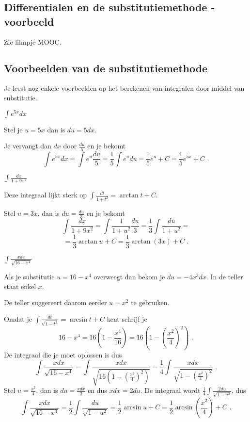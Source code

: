 \subsection{Differentialen en de substitutiemethode - voorbeeld}
Zie filmpje MOOC.

\subsection{Voorbeelden van de substitutiemethode}

Je leest nog enkele voorbeelden op het berekenen van integralen door middel van substitutie.

\vspace{2mm}

\begin{voorbeeld}
	$\int e^{5x}dx$
	
	Stel je $u=5x$ dan is $du=5dx$.
	
	Je vervangt dan $dx$ door $\frac{du}{5}$ en je bekomt
	\[
	\int e^{5x}dx=\int e^u\frac{du}{5}=\frac{1}{5} \int e^udu=\frac{1}{5} e^u+C=\frac{1}{5}e^{5x}+C \text { .}
	\]
	
\end{voorbeeld}

\begin{voorbeeld}
	$\int \frac{dx}{1+9x^2}$
	
	Deze integraal lijkt sterk op $\int \frac{dt}{1+t^2}=\arctan t+C$.
	
	Stel $u=3x$, dan is $du=\frac{du}{3}$ en je bekomt
	\[
	\int \frac{dx}{1+9x^2}=\int \frac{1}{1+u^2} \frac{du}{3} =\frac{1}{3} \int \frac{du}{1+u^2}=
	\]
	\[
	=\frac{1}{3} \arctan u+C=\frac{1}{3} \arctan (3x)+C \text { .}
	\]
\end{voorbeeld}
	
\begin{voorbeeld}
	$\int \frac{xdx}{\sqrt{16-x^4}}$
	
	Als je substitutie $u=16-x^4$ overweegt dan bekom je $du=-4x^3dx$.
	In de teller staat enkel $x$.
	
	De teller suggereert daarom eerder $u=x^2$ te gebruiken.
	
	Omdat je $\int \frac{dt}{\sqrt {1-t^2}}=\arcsin t+C$ kent schrijf je 
	\[
	16-x^4=16\left( 1-\frac{x^4}{16} \right)=16 \left( 1-\left( \frac{x^2}{4} \right)^2 \right) \text { .}
	\]
	De integraal die je moet oplossen is dus
	\[
	\int \frac{xdx}{\sqrt{16-x^4}}=\int \frac{xdx}{\sqrt {16 \left( 1-\left( \frac{x^2}{4} \right)^2 \right)   }}=\frac{1}{4} \int \frac{xdx}{ \sqrt{ 1-\left( \frac{x^2}{4} \right)^2   }} \text { .}
	\]
	Stel $u=\frac{x^2}{4}$, dan is $du =\frac{xdx}{2}$ en dus $xdx=2du$.
	De integraal wordt $\frac{1}{4} \int \frac{2du}{\sqrt {1-u^2}}$, dus
	\[
	\int \frac{xdx}{\sqrt{16-x^4}}=\frac{1}{2} \int \frac{du}{\sqrt {1-u^2}}=\frac{1}{2} \arcsin u+C=\frac{1}{2} \arcsin \left( \frac{x^2}{4} \right)+C \text { .}
	\]
\end{voorbeeld}
	
